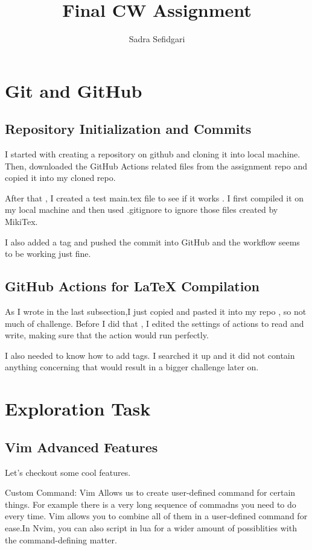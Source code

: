 \documentclass[titlepage]{article}
\title{\textbf{Final CW Assignment}}
\author{Sadra Sefidgari}
\begin{document}
\maketitle
\tableofcontents
\newpage

\section{Git and GitHub}
\subsection{Repository Initialization and Commits}
I started with creating a repository on github and cloning it into local machine.
Then, downloaded the GitHub Actions related files from the assignment repo and copied it into my cloned repo.

After that , I created a test main.tex file to see if it works .
I first compiled it on my local machine and then used .gitignore to ignore those files created by MikiTex.

I also added a tag and pushed the commit into GitHub and the workflow seems to be working just fine.
\subsection{GitHub Actions for LaTeX Compilation}

As I wrote in the last subsection,I just copied and pasted it into my repo , so not much of challenge.
Before I did that , I edited the settings of actions to read and write, making sure that the action would run perfectly.

I also needed to know how to add tags. I searched it up and it did not contain anything concerning that would result in a bigger challenge later on.

\section{Exploration Task}
\subsection{Vim Advanced Features}
Let's checkout some cool features.

Custom Command: Vim Allows us to create user-defined command for certain things. For example there is a very long sequence of commadns you need to do every time.
Vim allows you to combine all of them in a user-defined command for ease.In Nvim, you can also script in lua for a wider amount of possiblities with the command-defining matter.
\end{document}

